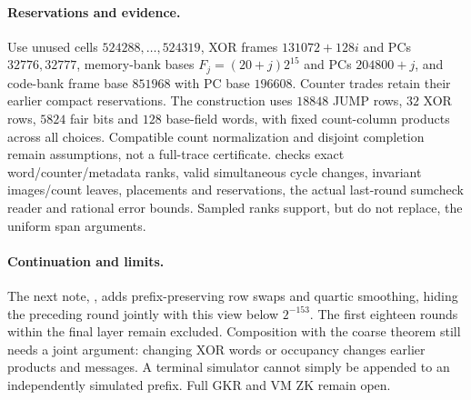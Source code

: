\paragraph{Reservations and evidence.} Use unused cells $524288,\ldots,524319$, XOR frames $131072+128i$ and PCs $32776,32777$, memory-bank bases $F_j=(20+j)2^{15}$ and PCs $204800+j$, and code-bank frame base $851968$ with PC base $196608$. Counter trades retain their earlier compact reservations. The construction uses $18848$ JUMP rows, $32$ XOR rows, $5824$ fair bits and $128$ base-field words, with fixed count-column products across all choices. Compatible count normalization and disjoint completion remain assumptions, not a full-trace certificate.  checks exact word/counter/metadata ranks, valid simultaneous cycle changes, invariant images/count leaves, placements and reservations, the actual last-round sumcheck reader and rational error bounds. Sampled ranks support, but do not replace, the uniform span arguments.

\paragraph{Continuation and limits.} The next note, , adds prefix-preserving row swaps and quartic smoothing, hiding the preceding round jointly with this view below $2^{-153}$. The first eighteen rounds within the final layer remain excluded. Composition with the coarse theorem still needs a joint argument: changing XOR words or occupancy changes earlier products and messages. A terminal simulator cannot simply be appended to an independently simulated prefix. Full GKR and VM ZK remain open.
